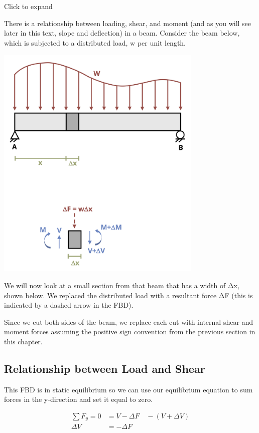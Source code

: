 \documentclass[
  letterpaper,
  DIV=11,
  numbers=noendperiod]{scrreprt}
\begin{document}
Click to expand

There is a relationship between loading, shear, and moment (and as you
will see later in this text, slope and deflection) in a beam. Consider
the beam below, which is subjected to a distributed load, w per unit
length.

\begin{center}
\includegraphics[width=3.875in,height=\textheight]{images/CH7 PNGs/figure 7.4.png}
\end{center}

We will now look at a small section from that beam that has a width of
Δx, shown below. We replaced the distributed load with a resultant force
ΔF (this is indicated by a dashed arrow in the FBD).

Since we cut both sides of the beam, we replace each cut with internal
shear and moment forces assuming the positive sign convention from the
previous section in this chapter.

\subsection{Relationship between Load and
Shear}\label{relationship-between-load-and-shear}

This FBD is in static equilibrium so we can use our equilibrium equation
to sum forces in the y-direction and set it equal to zero.

\[
\begin{aligned}
\sum F_y=0 & =V-\Delta F \quad-(V+\Delta V) \\
\Delta V & =-\Delta F
\end{aligned}
\]
\end{document}
